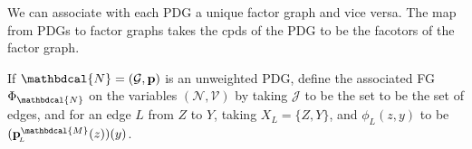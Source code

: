 \documentclass[letterpaper]{article} %
\theoremstyle{plain}
\theoremstyle{definition}
\theoremstyle{remark}
\newcommand\mat[1]{\mathbf{#1}}
\newcommand{\bp}[1][L]{\mat{p}_{\!_{#1}\!}}
\newcommand{\V}{\mathcal V}
\newcommand{\N}{\mathcal N}
\newcommand{\Ed}{\mathcal E}
\newcommand{\dg}[1]{\mathbdcal{#1}}
\newcommand{\WFGof}[1]{\Psi_{{#1}}}
\newcommand{\FGof}[1]{\Phi_{{#1}}}
\newcommand{\Gr}{\mathcal G}
\newcommand{\varsNV}[1][\N,\V]{(#1)}
\begin{document}
We can associate with each PDG a unique factor graph and vice versa.
The map from PDGs to factor graphs takes the cpds of the PDG to be the
facotors of the factor graph.  

\begin{defn}\label{def:PDG2fg}
If $\dg N = (\Gr, \mat p)$ is an unweighted PDG, define   
the associated FG $\FGof{\dg N}$ on the 
variables $\varsNV$ by
taking $\mathcal J$ to be the set to be the set of edges, 
and for an edge $L$ from $Z$ to $Y$, taking $X_{L} = \{Z,Y\}$, and $\phi_L(z,y)$ to be $(\bp^{\dg M}(z))(y)$.
\end{defn}
\end{document}
